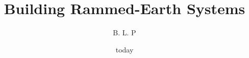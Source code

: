 \documentclass{article}
\begin{document}
\title{Building Rammed-Earth Systems}
\author{B. L. P}
\date{today}
\maketitle
\clearpage




\clearpage


\clearpage

\printbibliography
\end{document}
